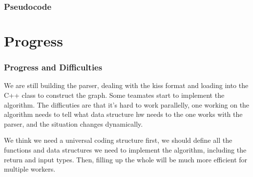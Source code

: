 \documentclass[aspectratio=169]{beamer}
\begin{document}
\begin{frame}
\frametitle{Pseudocode}
\centering
{}
\end{frame}

\section{Progress}

\begin{frame}
\frametitle{Progress and Difficulties}
We are still building the parser, dealing with the kiss format and loading into the C++ class to construct the graph. Some teamates start to implement the algorithm. The difficuties are that it's hard to work parallelly, one working on the algorithm needs to tell what data structure hw needs to the one works with the parser, and the situation changes dynamically.

We think we need a universal coding structure first, we should define all the functions and data structures we need to implement the algorithm, including the return and input types. Then, filling up the whole will be much more efficient for multiple workers.

\end{frame}
\end{document}
